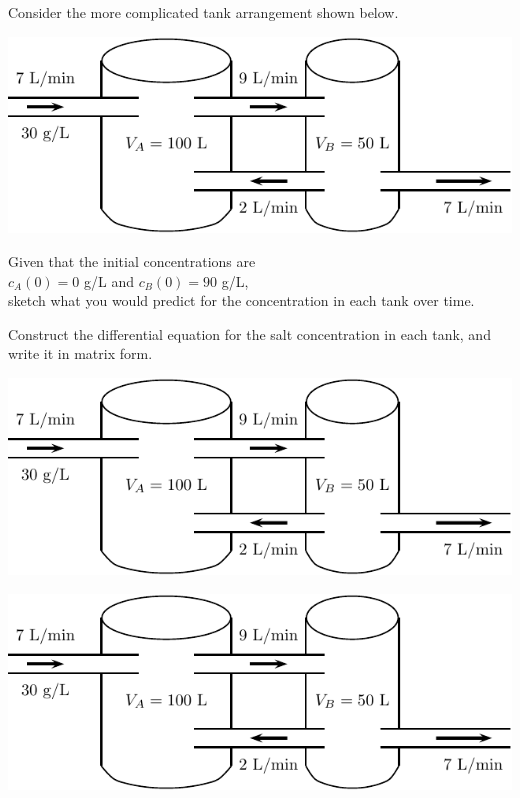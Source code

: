 Consider the more complicated tank arrangement shown below.
\begin{center}
\includegraphics[width=0.7\linewidth]{graphics/notes_09_tanks2}
\end{center}
\begin{problem}
Given that the initial concentrations are \\
$c_A(0) = 0 $ g/L and $c_B(0)  = 90$ g/L,  \\
sketch what you would predict for the concentration in each tank over time.
\end{problem}

\newpage
\begin{minipage}[h]{0.5\linewidth}
\vspace{0pt}
\begin{problem}
  Construct the differential equation for the salt concentration in
  each tank, and write it in matrix form.
\end{problem}
\end{minipage} \hfill
\begin{minipage}[h]{0.45\linewidth}
\vspace{0pt}
\includegraphics[width=1.0\linewidth]{graphics/notes_09_tanks2}
\end{minipage}

\newpage
\hfill \includegraphics[width=0.5\linewidth]{graphics/notes_09_tanks2}

